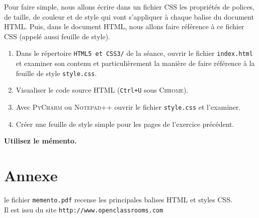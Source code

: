 	
	Pour faire simple, nous allons écrire dans un fichier CSS les propriétés de polices, de taille, de couleur et de style qui vont s'appliquer à 
	chaque balise du document \textsc{HTML}. Puis, dans 
	le document \textsc{HTML}, nous allons faire référence à ce fichier CSS (appelé aussi feuille de style).
	
\begin{exercice}
	\begin{enumerate}
		\item 	Dans le répertoire \texttt{\textsc{HTML}5 et CSS3/} de la séance, ouvrir le fichier \texttt{index.html} et examiner son contenu et 
		particulièrement 
		la manière de faire référence à la feuille de style \texttt{style.css}.
		\item 	Visualiser le code source \textsc{HTML} (\texttt{Ctrl+U} sous \textsc{Chrome}).
		\item 	Avec \textsc{PyCharm} ou \textsc{Notepad++} ouvrir le fichier \texttt{style.css} et l'examiner.
		\item 	Créer une feuille de style simple pour les pages de l'exercice précédent.\\
	\end{enumerate}
		\textbf{Utilisez le mémento.}
\end{exercice}
\section{Annexe}

le fichier \texttt{memento.pdf} recense les principales balises \textsc{HTML} et styles CSS.\\
Il est issu du site \texttt{http://www.openclassrooms.com}

